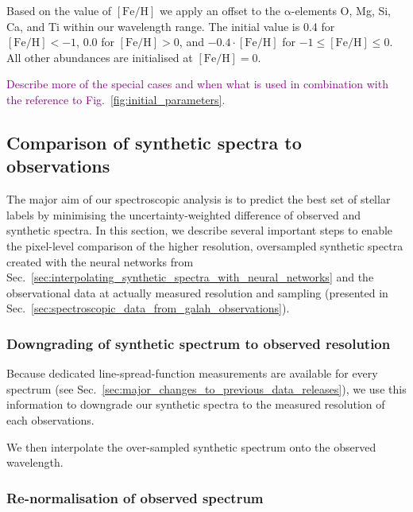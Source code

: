 \documentclass[
  journal=pasa,
  manuscript=research-paper, %
  year=2023,
  volume=37
]{cup-journal}
\newcommand{\SB}[1]{{\textcolor{purple}{#1}}}
\newcommand{\feh}{$\mathrm{[Fe/H]}$\xspace}
\begin{document}
Based on the value of \feh we apply an offset to the $\mathrm{\alpha}$-elements O, Mg, Si, Ca, and Ti within our wavelength range. The initial value is 0.4 for $\mathrm{[Fe/H]} < -1$, 0.0 for $\mathrm{[Fe/H]} > 0$, and $-0.4\cdot \mathrm{[Fe/H]}$ for $-1 \leq \mathrm{[Fe/H]} \leq 0$. All other abundances are initialised at $\mathrm{[Fe/H]} = 0$.

\SB{Describe more of the special cases and when what is used in combination with the reference to Fig.~\ref{fig:initial_parameters}.}


\subsection{Comparison of synthetic spectra to observations}
\label{sec:comparison_synthetic_spectra_to_observations}

The major aim of our spectroscopic analysis is to predict the best set of stellar labels by minimising the uncertainty-weighted difference of observed and synthetic spectra. In this section, we describe several important steps to enable the pixel-level comparison of the higher resolution, oversampled synthetic spectra created with the neural networks from Sec.~\ref{sec:interpolating_synthetic_spectra_with_neural_networks} and the observational data at actually measured resolution and sampling (presented in Sec.~\ref{sec:spectroscopic_data_from_galah_observations}).

\subsubsection{Downgrading of synthetic spectrum to observed resolution}

Because dedicated line-spread-function measurements are available for every spectrum (see Sec.~\ref{sec:major_changes_to_previous_data_releases}), we use this information to downgrade our synthetic spectra to the measured resolution of each observations.

We then interpolate the over-sampled synthetic spectrum onto the observed wavelength.

\subsubsection{Re-normalisation of observed spectrum}
\end{document}
